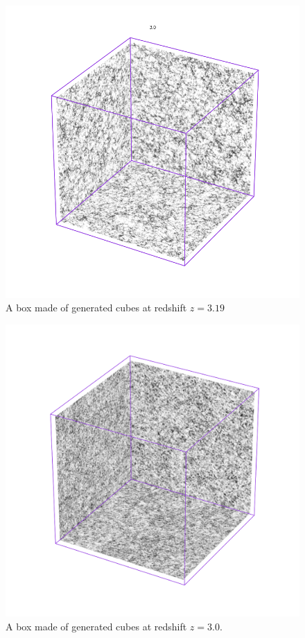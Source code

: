 \documentclass[twocolumn]{article}
\numberwithin{equation}{section}
\begin{document}
\begin{figure}[!ht]%
\includegraphics[width=\columnwidth]{figures/cubes/mill_box_3.png}
\centering
\caption{A box made of generated cubes at redshift $z=3.19$}
\label{fig:kernel_fig}
\end{figure}

\begin{figure}[!ht]%
\includegraphics[width=\columnwidth]{figures/cubes/gen_box_9_z3.png}
\centering
\caption{A box made of generated cubes at redshift $z=3.0$.}
\label{fig:kernel_fig}
\end{figure}
\end{document}
